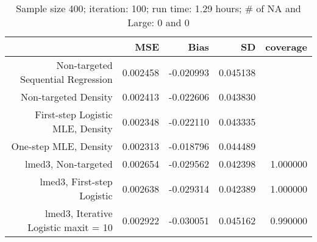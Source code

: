 \begin{table}[ht]
\centering
\caption{Sample size 400; iteration: 100; run time: 1.29 hours; # of NA and Large:  0 and 0} 
\begin{tabular}{rrrrr}
  \hline
 & MSE & Bias & SD & coverage \\ 
  \hline
Non-targeted Sequential Regression & 0.002458 & -0.020993 & 0.045138 &  \\ 
  Non-targeted Density & 0.002413 & -0.022606 & 0.043830 &  \\ 
  First-step Logistic MLE, Density & 0.002348 & -0.022110 & 0.043335 &  \\ 
  One-step MLE, Density & 0.002313 & -0.018796 & 0.044489 &  \\ 
  lmed3, Non-targeted & 0.002654 & -0.029562 & 0.042398 & 1.000000 \\ 
  lmed3, First-step Logistic & 0.002638 & -0.029314 & 0.042389 & 1.000000 \\ 
  lmed3, Iterative Logistic maxit = 10 & 0.002922 & -0.030051 & 0.045162 & 0.990000 \\ 
   \hline
\end{tabular}
\end{table}
